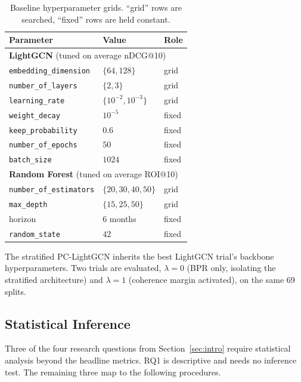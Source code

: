 \begin{table}[t]
\centering
\small
\begin{tabular}{lll}
\toprule
Parameter & Value & Role \\
\midrule
\multicolumn{3}{l}{\textbf{LightGCN} (tuned on average nDCG@10)} \\
\texttt{embedding\_dimension}   & $\{64, 128\}$         & grid \\
\texttt{number\_of\_layers}     & $\{2, 3\}$            & grid \\
\texttt{learning\_rate}         & $\{10^{-2}, 10^{-3}\}$ & grid \\
\texttt{weight\_decay}          & $10^{-5}$             & fixed \\
\texttt{keep\_probability}      & $0.6$                 & fixed \\
\texttt{number\_of\_epochs}     & $50$                  & fixed \\
\texttt{batch\_size}            & $1024$                & fixed \\
\midrule
\multicolumn{3}{l}{\textbf{Random Forest} (tuned on average ROI@10)} \\
\texttt{number\_of\_estimators} & $\{20, 30, 40, 50\}$  & grid \\
\texttt{max\_depth}             & $\{15, 25, 50\}$      & grid \\
horizon                         & 6 months              & fixed \\
\texttt{random\_state}          & $42$                  & fixed \\
\bottomrule
\end{tabular}
\caption{Baseline hyperparameter grids. ``grid'' rows are searched, ``fixed'' rows are held constant.}
\label{tab:baseline-grids}
\end{table}

The stratified PC-LightGCN inherits the best LightGCN trial's backbone hyperparameters. Two trials are evaluated, $\lambda = 0$ (BPR only, isolating the stratified architecture) and $\lambda = 1$ (coherence margin activated), on the same 69 splits.

\subsection{Statistical Inference}
\label{sec:setup:stats}

Three of the four research questions from Section~\ref{sec:intro} require statistical analysis beyond the headline metrics. RQ1 is descriptive and needs no inference test. The remaining three map to the following procedures.


